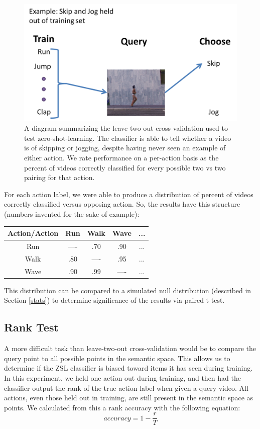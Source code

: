 \documentclass{article}
\begin{document}
\begin{figure}[h]
  \centering
  \includegraphics[width = .45\linewidth]{ltocv}
  \caption{A diagram summarizing the leave-two-out cross-validation used to test zero-shot-learning. The classifier is able to tell whether a video is of skipping or jogging, despite having never seen an example of either action. We rate performance on a per-action basis as the percent of videos correctly classified for every possible two vs two pairing for that action.}
  \label{ltocv}
\end{figure}

For each action label, we were able to produce a distribution of percent of videos correctly classified versus opposing action. So, the results have this structure (numbers invented for the sake of example):

\begin{table}[h]
\centering
\begin{tabular}{c|c|c|c|c}
Action/Action & Run & Walk & Wave & ... \\ \hline
Run & ---- & .70 & .90 & ... \\ \hline
Walk & .80 & ---- & .95 & ... \\ \hline
Wave & .90 & .99 & ---- & ... \\
\end{tabular}
\end{table}

This distribution can be compared to a simulated null distribution (described in Section \ref{stats}) to determine significance of the results via paired t-test.

\subsection{Rank Test}
A more difficult task than leave-two-out cross-validation would be to compare the query point to all possible points in the semantic space. This allows us to determine if the ZSL classifier is biased toward items it has seen during training. In this experiment, we held one action out during training, and then had the classifier output the rank of the true action label when given a query video. All actions, even those held out in training, are still present in the semantic space as points. We calculated from this a rank accuracy with the following equation:
\begin{equation}
accuracy = 1 - \frac{r}{T}
\end{equation}
\end{document}
